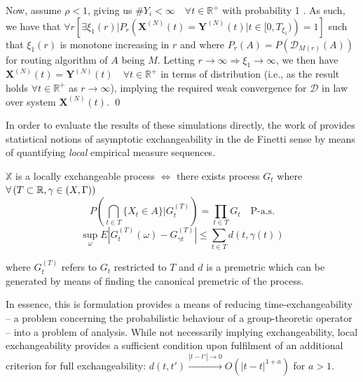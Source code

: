 Now, assume $\rho< 1$, giving us $ \# Y_{i}  < \infty \quad \forall t \in \mathbb{R}^{+}$ with probability 1 \cite{gardner_redundancy-d_2017}. As such, we have that $\forall r \left[\exists \xi_{1}(r) | P_{r}\left(\mathbf{X}^{(N)}(t) = \mathbf{Y}^{(N)}(t) |t \in [0,T_{\xi_{1}})\right) = 1\right]$ such that $\xi_{1} (r)$ is monotone increasing in $r$ and where $P_{r}(A) = P(\mathcal{D}_{M(r)}(A))$ for routing algorithm of $A$ being $M$.  Letting $r \rightarrow \infty \Rightarrow \xi_{1} \rightarrow \infty$, we then have $\mathbf{X}^{(N)}(t) =  \mathbf{Y}^{(N)}(t) \quad \forall t \in \mathbb{R}^{+}$ in terms of distribution (i.e., as the result holds $\forall t \in \mathbb{R}^{+}$ as $r\rightarrow \infty$), implying the required weak convergence for $\mathcal{D}$ in law over system  $\mathbf{X}^{(N)}(t)$.  \qed

In order to evaluate the results of these simulations directly, the work of \cite{campbell2020local} provides statistical notions of asymptotic exchangeability in the de Finetti sense by means of quantifying \textit{local} empirical measure sequences.

\begin{definition}
	$\mathbb{X}$ is a locally  exchangeable process $\iff$ there exists process $G_{t}$ where $\forall \left(T \subset\mathbb{R}, \gamma \in \text(X,\Gamma)\right) $
	\[P\left(\bigcap_{t \in T} \{X_{t} \in A\} | G^{(T)}_{t} \right) = \prod_{t \in T} G_{t} \quad \text{P-a.s.}\]
		\[\sup_{\omega}E|G^{(T)}_{t} (\omega)-G^{(T)}_{\gamma t}| \leq \sum_{t \in T} d(t, \gamma(t))\]
	
	where $G^{(T)}_{t}$ refers to $G_{t}$ restricted to $T$ and $d$ is a premetric which can be generated by means of finding the canonical premetric of the process. 
\end{definition}
In essence, this is formulation provides a means of reducing time-exchangeability -- a problem concerning the probabilistic behaviour of a  group-theoretic operator -- into a problem of analysis.  While not necessarily implying exchangeability, local exchangeability provides a sufficient condition upon fulfilment of an additional criterion for full exchangeability: $d(t,t') \overset{|t-t'|\rightarrow 0}\rightarrow O(|t-t|^{1+a})$ for $a>1$.

